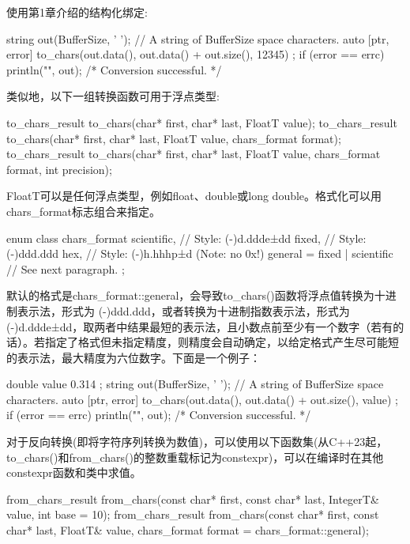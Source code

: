 使用第1章介绍的结构化绑定:

\begin{cpp}
string out(BufferSize, ' '); // A string of BufferSize space characters.
auto [ptr, error] { to_chars(out.data(), out.data() + out.size(), 12345) };
if (error == errc{}) { println("{}", out); /* Conversion successful. */ }
\end{cpp}

类似地，以下一组转换函数可用于浮点类型:

\begin{cpp}
to_chars_result to_chars(char* first, char* last, FloatT value);
to_chars_result to_chars(char* first, char* last, FloatT value,
                         chars_format format);
to_chars_result to_chars(char* first, char* last, FloatT value,
                         chars_format format, int precision);
\end{cpp}

FloatT可以是任何浮点类型，例如float、double或long double。格式化可以用chars\_format标志组合来指定。

\begin{cpp}
enum class chars_format {
    scientific, // Style: (-)d.ddde±dd
    fixed, // Style: (-)ddd.ddd
    hex, // Style: (-)h.hhhp±d (Note: no 0x!)
    general = fixed | scientific // See next paragraph.
};
\end{cpp}

默认的格式是chars\_format::general，会导致to\_chars()函数将浮点值转换为十进制表示法，形式为 (-)ddd.ddd，或者转换为十进制指数表示法，形式为 (-)d.ddde±dd，取两者中结果最短的表示法，且小数点前至少有一个数字（若有的话）。若指定了格式但未指定精度，则精度会自动确定，以给定格式产生尽可能短的表示法，最大精度为六位数字。下面是一个例子：

\begin{cpp}
double value { 0.314 };
string out(BufferSize, ' '); // A string of BufferSize space characters.
auto [ptr, error] { to_chars(out.data(), out.data() + out.size(), value) };
if (error == errc{}) { println("{}", out); /* Conversion successful. */ }
\end{cpp}


对于反向转换(即将字符序列转换为数值)，可以使用以下函数集(从C++23起，to\_chars()和from\_chars()的整数重载标记为constexpr)，可以在编译时在其他constexpr函数和类中求值。

\begin{cpp}
from_chars_result from_chars(const char* first, const char* last, IntegerT& value,
                             int base = 10);
from_chars_result from_chars(const char* first, const char* last, FloatT& value,
                             chars_format format = chars_format::general);
\end{cpp}

